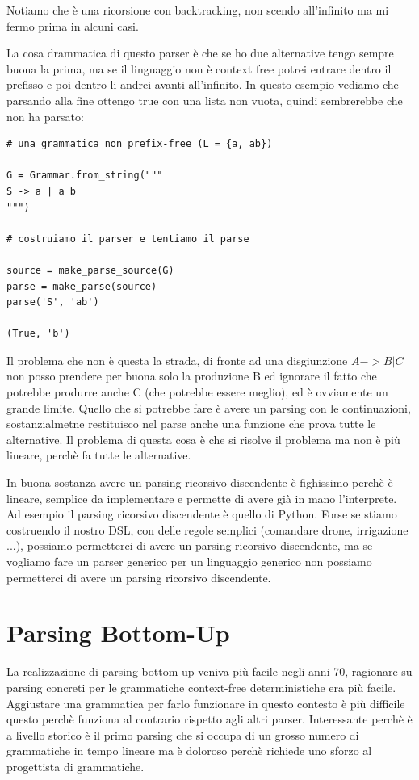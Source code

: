 Notiamo che è una ricorsione con backtracking, non scendo all'infinito ma mi fermo prima in alcuni casi.

La cosa drammatica di questo parser è che se ho due alternative tengo sempre buona la prima, ma se il linguaggio non è context free potrei entrare dentro il prefisso e poi dentro li andrei avanti all'infinito. In questo esempio vediamo che parsando alla fine ottengo true con una lista non vuota, quindi sembrerebbe che non ha parsato:
\begin{lstlisting}
# una grammatica non prefix-free (L = {a, ab})

G = Grammar.from_string("""
S -> a | a b
""")

# costruiamo il parser e tentiamo il parse

source = make_parse_source(G)
parse = make_parse(source)
parse('S', 'ab')

(True, 'b') 
\end{lstlisting}

Il problema che non è questa la strada, di fronte ad una disgiunzione $A -> B | C$ non posso prendere per buona solo la produzione B ed ignorare il fatto che potrebbe produrre anche C (che potrebbe essere meglio), ed è ovviamente un grande limite. Quello che si potrebbe fare è avere un parsing con le continuazioni, sostanzialmetne restituisco nel parse anche una funzione che prova tutte le alternative. Il problema di questa cosa è che si risolve il problema ma non è più lineare, perchè fa tutte le alternative.

In buona sostanza avere un parsing ricorsivo discendente è fighissimo perchè è lineare, semplice da implementare e permette di avere già in mano l'interprete. Ad esempio il parsing ricorsivo discendente è quello di Python.
Forse se stiamo costruendo il nostro DSL, con delle regole semplici (comandare drone, irrigazione ...), possiamo permetterci di avere un parsing ricorsivo discendente, ma se vogliamo fare un parser generico per un linguaggio generico non possiamo permetterci di avere un parsing ricorsivo discendente.

\section{Parsing Bottom-Up}
La realizzazione di parsing bottom up veniva più facile negli anni 70, ragionare su parsing concreti per le grammatiche context-free deterministiche era più facile. Aggiustare una grammatica per farlo funzionare in questo contesto è più difficile questo perchè funziona al contrario rispetto agli altri parser.
Interessante perchè è a livello storico è il primo parsing che si occupa di un grosso numero di grammatiche in tempo lineare ma è doloroso perchè richiede uno sforzo al progettista di grammatiche.

